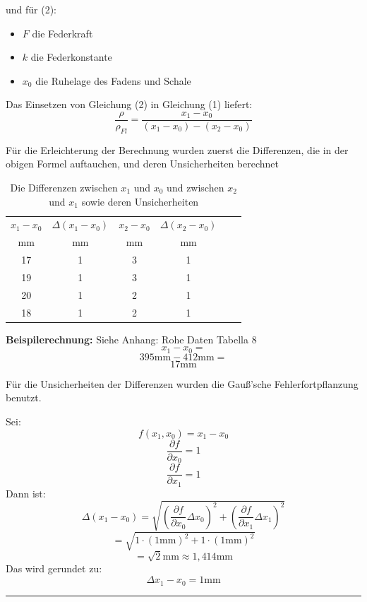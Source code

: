 \documentclass[11pt,a4paper]{article} %
\begin{document}
und für (2):
\begin{itemize}
	\item $F$ die Federkraft
	\item $k$ die Federkonstante
	\item $x_0$ die Ruhelage des Fadens und Schale
\end{itemize}

Das Einsetzen von Gleichung (2) in Gleichung (1) liefert: 
\begin{equation}
\frac{\rho}{\rho_{Fl}} = \frac{x_1-x_0}{(x_1-x_0)-(x_2-x_0)}
\end{equation}

Für die Erleichterung der Berechnung wurden zuerst die Differenzen, die in der obigen Formel auftauchen, und deren Unsicherheiten berechnet

\begin{table}[h]
	\begin{tabular*}{0.99\textwidth}{@{\extracolsep{\fill}}cccccc}
		\toprule
		$x_1-x_0$ & $\Delta (x_1-x_0)$ &  $x_2-x_0$  &  $\Delta(x_2-x_0)$  \\
		mm & mm &  mm & mm   \\
		\midrule
		17 & 1 & 3 & 1 \\
		19 & 1 & 3 & 1 \\
		20 & 1 & 2 & 1 \\
		18 & 1 & 2 & 1 \\
		
		\bottomrule
	\end{tabular*}
	\caption{Die Differenzen zwischen $x_1$ und $x_0$ und zwischen $x_2$ und $x_1$ sowie deren Unsicherheiten}
	\label{tabelle}
\end{table}



\begin{tcolorbox}[colback=white]
\textbf{Beispilerechnung:}
      Siehe Anhang: Rohe Daten Tabella 8
$$x_1-x_0=$$
$$395\textrm{mm}-412\textrm{mm}=$$
$$17\textrm{mm}$$

Für die Unsicherheiten der Differenzen wurden die Gauß'sche Fehlerfortpflanzung benutzt.

Sei:
$$f(x_1,x_0)=x_1-x_0$$
$$\frac{\partial f}{\partial x_0}=1$$
$$\frac{\partial f}{\partial x_1}=1$$
Dann ist:
$$\Delta({x_1-x_0})=\sqrt{(\frac{\partial f}{\partial x_0}\Delta{x_0})^2+(\frac{\partial f}{\partial x_1}\Delta{x_1})^2}$$
$$=\sqrt{1\cdot(1\textrm{mm})^2+1\cdot(1\textrm{mm})^2}$$
$$=\sqrt{2}\textrm{mm}\approx1,414\textrm{mm}$$
Das wird gerundet zu:
$$\Delta{x_1-x_0}=1\textrm{mm}$$
\end{tcolorbox}
\hrule
\end{document}
